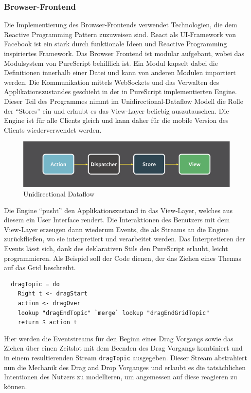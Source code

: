\subsubsection{Browser-Frontend}
Die Implementierung des Browser-Frontends verwendet Technologien, die
dem \gls{Reactive Programming} Pattern zuzuweisen sind. \gls{React} als
UI-Framework von Facebook ist ein stark durch funktionale Ideen und
\gls{Reactive Programming} inspiriertes Framework. Das Browser
Frontend ist modular aufgebaut, wobei das Modulsystem von PureScript
behilflich ist. Ein Modul kapselt dabei die Definitionen innerhalb
einer Datei und kann von anderen Modulen importiert werden. Die
Kommunikation mittels WebSockets und das Verwalten des
Applikationszustandes geschieht in der in PureScript implementierten
Engine. Dieser Teil des Programmes nimmt im Unidirectional-Dataflow
Modell die Rolle der ``Stores'' ein und erlaubt es das View-Layer
beliebig auszutauschen. Die Engine ist für alle Clients gleich und
kann daher für die mobile Version des Clients wiederverwendet werden.
\begin{figure}[h]
\includegraphics[scale=0.3]{img/Unidirectional.png}
\caption{Unidirectional Dataflow}
\end{figure}

\noindent Die Engine ``pusht'' den Applikationszustand in das
View-Layer, welches aus diesem ein User Interface rendert.
Die Interaktionen des Benutzers mit dem View-Layer erzeugen dann
wiederum Events, die als Streams an die Engine zurückfließen, wo sie
interpretiert und verarbeitet werden. Das Interpretieren der Events
lässt sich, dank des deklarativen Stils den PureScript erlaubt, leicht
programmieren. Als Beispiel soll der Code dienen, der das Ziehen eines
Themas auf das Grid beschreibt.

\begin{lstlisting}
  dragTopic = do
    Right t <- dragStart
    action <- dragOver
    lookup "dragEndTopic" `merge` lookup "dragEndGridTopic"
    return $ action t
\end{lstlisting}
\noindent Hier werden die Eventstreams für den Beginn eines
Drag Vorgangs sowie das Ziehen über einen Zeitslot mit dem Beenden des
Drag Vorgangs kombiniert und in einem resultierenden Stream \texttt{dragTopic}
ausgegeben. Dieser Stream abstrahiert nun die Mechanik des Drag and
Drop Vorganges und erlaubt es die tatsächlichen Intentionen des
Nutzers zu modellieren, um angemessen auf diese reagieren zu können.
